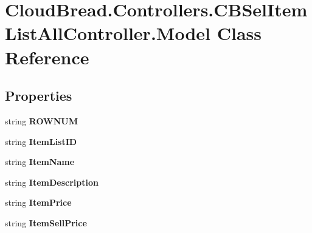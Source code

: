 \hypertarget{a00155}{}\section{Cloud\+Bread.\+Controllers.\+C\+B\+Sel\+Item\+List\+All\+Controller.\+Model Class Reference}
\label{a00155}
\subsection*{Properties}
\begin{DoxyCompactItemize}
\item 
string {\bfseries R\+O\+W\+N\+UM}\hypertarget{a00155_ae77b3b9516ed5a467f9b909663d683fb}{}\label{a00155_ae77b3b9516ed5a467f9b909663d683fb}

\item 
string {\bfseries Item\+List\+ID}\hypertarget{a00155_a73d0ab04cee0c474269c6adb152e7cfb}{}\label{a00155_a73d0ab04cee0c474269c6adb152e7cfb}

\item 
string {\bfseries Item\+Name}\hypertarget{a00155_a00784c57054e10e5921f5c493bba62d4}{}\label{a00155_a00784c57054e10e5921f5c493bba62d4}

\item 
string {\bfseries Item\+Description}\hypertarget{a00155_a798eb2bb9d59cb9a963f2ae010f7be05}{}\label{a00155_a798eb2bb9d59cb9a963f2ae010f7be05}

\item 
string {\bfseries Item\+Price}\hypertarget{a00155_ae5a83357c43132bb75032773241a395e}{}\label{a00155_ae5a83357c43132bb75032773241a395e}

\item 
string {\bfseries Item\+Sell\+Price}\hypertarget{a00155_a123805de9bdafa73689bac7b523d9bfc}{}\label{a00155_a123805de9bdafa73689bac7b523d9bfc}


\end{DoxyCompactItemize}

